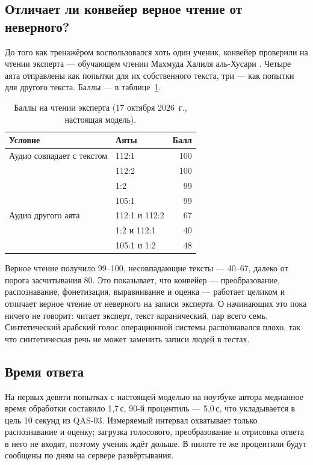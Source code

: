 \subsection{Отличает ли конвейер верное чтение от неверного?}

До того как тренажёром воспользовался хоть один ученик, конвейер проверили на чтении эксперта ---
обучающем чтении Махмуда Халиля аль-Хусари \cite{SRC-042}. Четыре аята отправлены как попытки для их
собственного текста, три --- как попытки для другого текста. Баллы --- в таблице~\ref{tab:husary}.

\begin{table}[ht]
\centering\small
\caption{Баллы на чтении эксперта (17 октября 2026~г., настоящая модель).}
\label{tab:husary}
\begin{tabular}{@{}llr@{}}
\toprule
Условие & Аяты & Балл \\
\midrule
Аудио совпадает с текстом & 112:1 & 100 \\
 & 112:2 & 100 \\
 & 1:2 & 99 \\
 & 105:1 & 99 \\
\midrule
Аудио другого аята & 112:1 и 112:2 & 67 \\
 & 1:2 и 112:1 & 40 \\
 & 105:1 и 1:2 & 48 \\
\bottomrule
\end{tabular}
\end{table}

Верное чтение получило 99--100, несовпадающие тексты --- 40--67, далеко от порога засчитывания 80. Это
показывает, что конвейер --- преобразование, распознавание, фонетизация, выравнивание и оценка --- работает
целиком и отличает верное чтение от неверного на записи эксперта. О начинающих это пока ничего не говорит:
читает эксперт, текст коранический, пар всего семь. Синтетический арабский голос операционной системы
распознавался плохо, так что синтетическая речь не может заменить записи людей в тестах.

\subsection{Время ответа}

На первых девяти попытках с настоящей моделью на ноутбуке автора медианное время обработки составило
1,7\,с, 90-й процентиль --- 5,0\,с, что укладывается в цель 10 секунд из QAS-03. Измеряемый интервал
охватывает только распознавание и оценку; загрузка голосового, преобразование и отрисовка ответа в него не
входят, поэтому ученик ждёт дольше. В пилоте те же процентили будут сообщены по дням на сервере
развёртывания.

